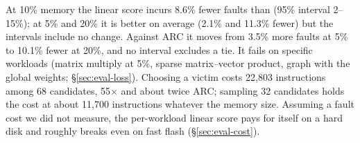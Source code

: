 At 10\% memory the linear score incurs 8.6\% fewer faults than \clock (95\% interval
2--15\%); at 5\% and 20\% it is better on average (2.1\% and 11.3\% fewer) but the
intervals include no change. Against ARC it moves from 3.5\% more faults at 5\% to
10.1\% fewer at 20\%, and no interval excludes a tie. It fails on specific workloads
(matrix multiply at 5\%, sparse matrix--vector product, graph with the global weights;
\S\ref{sec:eval-loss}). Choosing a victim costs 22,803 instructions among 68
candidates, 55$\times$ \clock and about twice ARC; sampling 32 candidates holds the cost
at about 11,700 instructions whatever the memory size. Assuming a fault cost we did not
measure, the per-workload linear score pays for itself on a hard disk and roughly breaks
even on fast flash (\S\ref{sec:eval-cost}).

